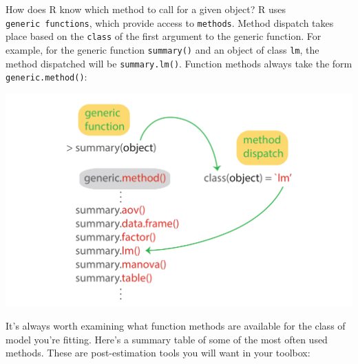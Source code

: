 \documentclass[
]{book}
\newenvironment{Shaded}{\begin{snugshade}}{\end{snugshade}}
\newcommand{\KeywordTok}[1]{\textcolor[rgb]{0.13,0.29,0.53}{\textbf{#1}}}
\newcommand{\NormalTok}[1]{#1}
\newcommand{\OperatorTok}[1]{\textcolor[rgb]{0.81,0.36,0.00}{\textbf{#1}}}
\newcommand{\StringTok}[1]{\textcolor[rgb]{0.31,0.60,0.02}{#1}}
\begin{document}
\begin{Shaded}
\end{Shaded}

How does R know which method to call for a given object?
R uses \texttt{generic\ functions}, which provide access to \texttt{methods}.
Method dispatch takes place based on the \texttt{class} of the
first argument to the generic function. For example, for the generic
function \texttt{summary()} and an object of class \texttt{lm}, the method
dispatched will be \texttt{summary.lm()}. Function methods always take
the form \texttt{generic.method()}:

\includegraphics{R/Rmodels/images/methods.png}

It's always worth examining what function methods are available for the class of model you're fitting.
Here's a summary table of some of the most often used methods. These are post-estimation tools you
will want in your toolbox:
\end{document}
